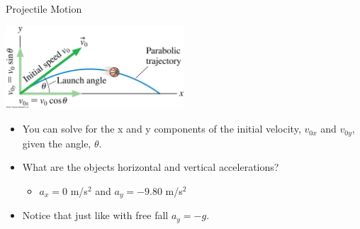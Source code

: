 \documentclass{beamer}
\begin{document}
\begin{frame}{Projectile Motion}
\begin{center}
   \includegraphics[width=0.5\textwidth]{../figures/projectile.jpg}
\end{center}
\begin{itemize}
   \item You can solve for the x and y components of the initial velocity, $v_{0x}$ and $v_{0y}$, given the angle, $\theta$.
   \item<2-> What are the objects horizontal and vertical accelerations?
   \begin{itemize}
      \item<3-> $a_x = 0$ m/s$^2$ and $a_y = -9.80$ m/s$^2$
   \end{itemize}
   \item<3-> Notice that just like with free fall $a_y=-g$.
\end{itemize}
\end{frame}
\end{document}
